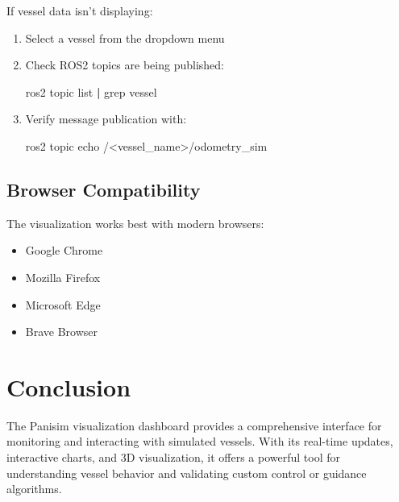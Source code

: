 \documentclass[
  letterpaper,
  DIV=11,
  numbers=noendperiod]{scrreprt}
\newenvironment{Shaded}{\begin{snugshade}}{\end{snugshade}}
\newcommand{\ExtensionTok}[1]{\textcolor[rgb]{0.00,0.23,0.31}{#1}}
\newcommand{\FunctionTok}[1]{\textcolor[rgb]{0.28,0.35,0.67}{#1}}
\newcommand{\KeywordTok}[1]{\textcolor[rgb]{0.00,0.23,0.31}{\textbf{#1}}}
\newcommand{\NormalTok}[1]{\textcolor[rgb]{0.00,0.23,0.31}{#1}}
\newcommand{\OperatorTok}[1]{\textcolor[rgb]{0.37,0.37,0.37}{#1}}
\providecommand{\tightlist}{%
  \setlength{\itemsep}{0pt}\setlength{\parskip}{0pt}}\usepackage{longtable,booktabs,array}
\begin{document}
If vessel data isn't displaying:

\begin{enumerate}
\def\labelenumi{\arabic{enumi}.}
\item
  Select a vessel from the dropdown menu
\item
  Check ROS2 topics are being published:

\begin{Shaded}
\begin{Highlighting}[]
\ExtensionTok{ros2}\NormalTok{ topic list }\KeywordTok{|} \FunctionTok{grep}\NormalTok{ vessel}
\end{Highlighting}
\end{Shaded}
\item
  Verify message publication with:

\begin{Shaded}
\begin{Highlighting}[]
\ExtensionTok{ros2}\NormalTok{ topic echo /}\OperatorTok{\textless{}}\NormalTok{vessel\_name}\OperatorTok{\textgreater{}}\NormalTok{/odometry\_sim}
\end{Highlighting}
\end{Shaded}
\end{enumerate}

\subsection*{Browser Compatibility}\label{browser-compatibility}

The visualization works best with modern browsers:

\begin{itemize}
\tightlist
\item
  Google Chrome
\item
  Mozilla Firefox\\
\item
  Microsoft Edge
\item
  Brave Browser
\end{itemize}

\section*{Conclusion}\label{conclusion}


The Panisim visualization dashboard provides a comprehensive interface
for monitoring and interacting with simulated vessels. With its
real-time updates, interactive charts, and 3D visualization, it offers a
powerful tool for understanding vessel behavior and validating custom
control or guidance algorithms.
\end{document}
